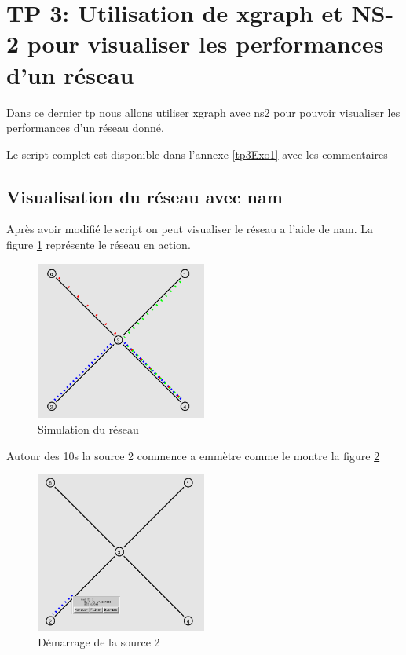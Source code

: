\documentclass[11pt]{article}
\begin{document}
\pagebreak
\section{TP 3: Utilisation de xgraph et NS-2 pour visualiser les performances d'un réseau}
Dans ce dernier tp nous allons utiliser xgraph avec ns2 pour pouvoir visualiser les performances d'un réseau donné. 

Le script complet est disponible dans l'annexe \ref{tp3Exo1} avec les commentaires 

\subsection{Visualisation du réseau avec nam}
Après avoir modifié le script on peut visualiser le réseau a l'aide de nam. La figure \ref{startTp3} représente le réseau en action.

\begin{figure}[H]
	\begin{center}
		\includegraphics[width=0.5\textwidth]{assets/tp3/tp3Start.png}
	\end{center}
	\caption{Simulation du réseau}
	\label{startTp3}
\end{figure}


Autour des 10s la source 2 commence a emmètre comme le montre la figure \ref{demarageSource2}

\begin{figure}[H]
	\begin{center}
		\includegraphics[width=0.5\textwidth]{assets/tp3/demarageSource2.png}
	\end{center}
	\caption{Démarrage de la source 2}
	\label{demarageSource2}
\end{figure}
\end{document}
